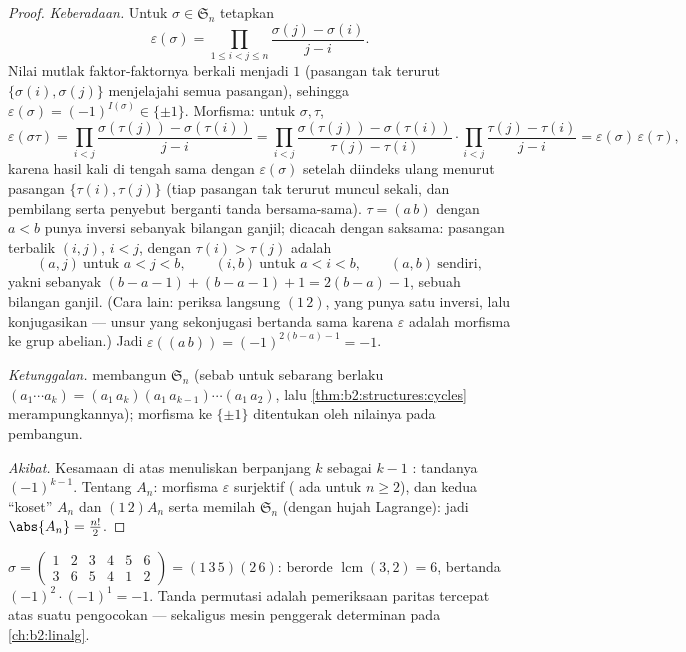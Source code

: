 \begin{proof}
\emph{Keberadaan.} Untuk $\sigma \in \mathfrak{S}_n$ tetapkan
\[
\varepsilon(\sigma)
= \prod_{1 \leq i < j \leq n}
\frac{\sigma(j) - \sigma(i)}{j - i} .
\]
Nilai mutlak faktor-faktornya berkali menjadi $1$ (pasangan tak terurut
$\{\sigma(i), \sigma(j)\}$ menjelajahi semua pasangan), sehingga
$\varepsilon(\sigma) = (-1)^{I(\sigma)} \in \{\pm1\}$. Morfisma: untuk
$\sigma, \tau$,
\[
\varepsilon(\sigma\tau)
= \prod_{i<j} \frac{\sigma(\tau(j)) - \sigma(\tau(i))}{j - i}
= \prod_{i<j} \frac{\sigma(\tau(j)) - \sigma(\tau(i))}{\tau(j) -
\tau(i)} \cdot \prod_{i<j} \frac{\tau(j) - \tau(i)}{j - i}
= \varepsilon(\sigma)\,\varepsilon(\tau),
\]
karena hasil kali di tengah sama dengan $\varepsilon(\sigma)$ setelah
diindeks ulang menurut pasangan $\{\tau(i), \tau(j)\}$ (tiap pasangan
tak terurut muncul sekali, dan pembilang serta penyebut berganti tanda
bersama-sama).  $\tau = (a\,b)$ dengan $a < b$ punya
inversi sebanyak bilangan ganjil; dicacah dengan saksama: pasangan
terbalik $(i, j)$, $i < j$, dengan $\tau(i) > \tau(j)$ adalah
\[
(a, j) \ \text{untuk } a < j < b, \qquad
(i, b) \ \text{untuk } a < i < b, \qquad
(a, b) \ \text{sendiri},
\]
yakni sebanyak $(b - a - 1) + (b - a - 1) + 1 = 2(b - a) - 1$,
sebuah bilangan ganjil. (Cara lain: periksa langsung $(1\,2)$, yang
punya satu inversi, lalu konjugasikan --- unsur yang sekonjugasi
bertanda sama karena $\varepsilon$ adalah morfisma ke grup abelian.)
Jadi $\varepsilon((a\,b)) = (-1)^{2(b-a)-1} = -1$.

\emph{Ketunggalan.}  membangun $\mathfrak{S}_n$ (sebab untuk
sebarang  berlaku
$(a_1\cdots a_k) = (a_1\,a_k)(a_1\,a_{k-1})\cdots(a_1\,a_2)$,
lalu \cref{thm:b2:structures:cycles} merampungkannya); morfisma ke
$\{\pm1\}$ ditentukan oleh nilainya pada pembangun.

\emph{Akibat.} Kesamaan  di atas menuliskan  berpanjang $k$
sebagai $k - 1$ : tandanya $(-1)^{k-1}$. Tentang $A_n$:
morfisma $\varepsilon$ surjektif ( ada untuk $n \geq 2$),
dan kedua ``koset'' $A_n$ dan $(1\,2)A_n$  serta memilah
$\mathfrak{S}_n$ (dengan hujah Lagrange): jadi $\abs{A_n} =
\frac{n!}{2}$.
\end{proof}

\begin{example}\label{ex:b2:structures:snexample}
$\sigma = \begin{pmatrix} 1&2&3&4&5&6\\ 3&6&5&4&1&2 \end{pmatrix}
= (1\,3\,5)(2\,6)$: berorde $\operatorname{lcm}(3,2) = 6$, bertanda
$(-1)^{2}\cdot(-1)^{1} = -1$. Tanda permutasi adalah pemeriksaan
paritas tercepat atas suatu pengocokan --- sekaligus mesin penggerak
determinan pada \cref{ch:b2:linalg}.
\end{example}

